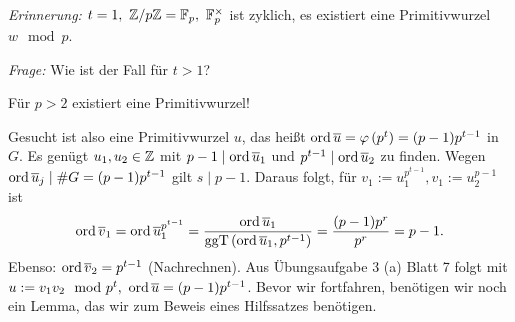 \documentclass[a4paper,twoside,DIV15,BCOR12mm]{scrbook}
\begin{document}
\emph{Erinnerung:} $t=1,\ \MdZ/p\MdZ=\MdF_p,\ \MdF_p^{\times}$ ist
zyklich, es existiert eine Primitivwurzel $w \mod p$.

\emph{Frage:} Wie ist der Fall für $t>1$?

Für $p>2$ existiert eine Primitivwurzel!

Gesucht ist also eine Primitivwurzel $u$, das heißt $\mathop{\rm ord}\nolimits \overline
u = \varphi\left(p^t\right)=(p-1)p^{t-1}$ in $G$. Es genügt $u_1,u_2
\in \mathbb{Z}$ mit $p-1 \mid \mathop{\rm ord}\nolimits \overline u_1$ und $p^{t-1} \mid \mathop{\rm ord}\nolimits
\overline u_2$ zu finden. Wegen $\mathop{\rm ord}\nolimits \overline u_j \mid
\#G=(p-1)p^{t-1}$ gilt $s \mid p-1$. Daraus folgt, für
$v_1:=u_1^{p^{t-1}},v_1:=u_2^{p-1}$ ist
\[
\mathop{\rm ord}\nolimits \overline v_1=\mathop{\rm ord}\nolimits \overline u_1^{p^{t-1}}=\frac{\mathop{\rm ord}\nolimits \overline
u_1}{\mathop{\rm ggT}\nolimits\left(\mathop{\rm ord}\nolimits \overline u_1,p^{t-1}
\right)}=\frac{(p-1)p^r}{p^r}=p-1.
\]
Ebenso: $\mathop{\rm ord}\nolimits\overline v_2=p^{t-1}$ (Nachrechnen). Aus Übungsaufgabe
3 (a) Blatt 7 folgt mit $u:=v_1v_2 \mod p^t,\ \mathop{\rm ord}\nolimits \overline
u=(p-1)p^{t-1}$. Bevor wir fortfahren, benötigen wir noch ein Lemma,
das wir zum Beweis eines Hilfssatzes benötigen.
\end{document}
